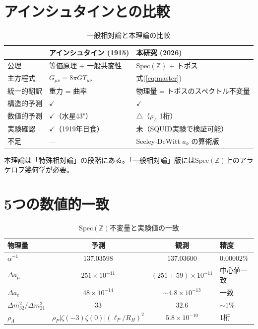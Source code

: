\documentclass[11pt,a4paper]{article}
\newcommand{\Spec}{\mathrm{Spec}}
\begin{document}
\section{アインシュタインとの比較}

\begin{table}[h]
\centering
\caption{一般相対論と本理論の比較}
\begin{tabular}{@{}lll@{}}
\toprule
& アインシュタイン (1915) & 本研究 (2026) \\
\midrule
公理 & 等価原理 + 一般共変性 & $\Spec(\mathbb{Z})$ + トポス \\
主方程式 & $G_{\mu\nu} = 8\pi G T_{\mu\nu}$ & 式(\ref{eq:master}) \\
統一的翻訳 & 重力 = 曲率 & 物理量 = トポスのスペクトル不変量 \\
構造的予測 & $\checkmark$ & $\checkmark$ \\
数値的予測 & $\checkmark$（水星43"） & $\triangle$（$\rho_\Lambda$ 1桁） \\
実験確認 & $\checkmark$（1919年日食） & 未（SQUID実験で検証可能） \\
不足 & --- & Seeley-DeWitt $a_k$ の算術版 \\
\bottomrule
\end{tabular}
\end{table}

本理論は「特殊相対論」の段階にある。「一般相対論」版には$\Spec(\mathbb{Z})$上のアラケロフ幾何学が必要。

\section{5つの数値的一致}

\begin{table}[h]
\centering
\caption{$\Spec(\mathbb{Z})$不変量と実験値の一致}
\begin{tabular}{@{}lccl@{}}
\toprule
物理量 & 予測 & 観測 & 精度 \\
\midrule
$\alpha^{-1}$ & $137.03598$ & $137.03600$ & $0.00002\%$ \\
$\Delta a_\mu$ & $251 \times 10^{-11}$ & $(251\pm59)\times 10^{-11}$ & 中心値一致 \\
$\Delta a_e$ & $48 \times 10^{-14}$ & $\sim 4.8 \times 10^{-13}$ & 一致 \\
$\Delta m^2_{32}/\Delta m^2_{21}$ & $33$ & $32.6$ & $\sim 1\%$ \\
$\rho_\Lambda$ & $\rho_P|\zeta(-3)\zeta(0)|(\ell_P/R_H)^2$ & $5.8\times10^{-10}$ & 1桁 \\
\bottomrule
\end{tabular}
\end{table}
\end{document}
